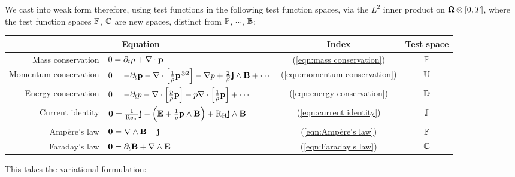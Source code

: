     We cast into weak form therefore, using test functions in the following test function spaces, via the $L^{2}$ inner product on $\pmb{\mathsf{\Omega}}\otimes[0, T]$, where the test function spaces $\mathbb{F}$, $\mathbb{C}$ are new spaces, distinct from $\mathbb{P}$, $\cdots$, $\mathbb{B}$:
    \begin{center}\begin{tabular}{ r l c | c }
        \multicolumn{2}{c}{Equation}  &  Index  &  Test space  \\
        \hline\hline
        Mass conservation  &  $0  =  \partial_{t}\rho + \nabla\cdot\mathbf{p}$  &  (\ref{eqn:mass conservation})  &  $\mathbb{P}$  \\
        Momentum conservation  &  $0  =  - \partial_{t}\mathbf{p} - \nabla\cdot\left[\frac{1}{\rho}\mathbf{p}^{\otimes 2}\right] - \nabla p + \frac{2}{\beta}\mathbf{j}\wedge\mathbf{B} + \cdots$  &  (\ref{eqn:momentum conservation})  &  $\mathbb{U}$  \\
        Energy conservation  &  $0  =  - \partial_{t}p - \nabla\cdot\left[\frac{p}{\rho}\mathbf{p}\right] - p\nabla\cdot\left[\frac{1}{\rho}\mathbf{p}\right] + \cdots$  &  (\ref{eqn:energy conservation})  &  $\mathbb{D}$  \\
        \hline
        Current identity  &  $\mathbf{0}  =  \frac{1}{\mathrm{Re}_{\mathrm{m}}}\mathbf{j} - \left(\mathbf{E} + \frac{1}{\rho}\mathbf{p}\wedge\mathbf{B}\right) + \mathrm{R}_{\mathrm{H}}\mathbf{j}\wedge\mathbf{B}$  &  (\ref{eqn:current identity})  &  $\mathbb{J}$  \\
        \hline
        Ampère's law  &  $\mathbf{0}  =  \nabla\wedge\mathbf{B} - \mathbf{j}$  &  (\ref{eqn:Ampère's law})  &  $\mathbb{F}$  \\
        Faraday's law  &  $\mathbf{0}  =  \partial_{t}\mathbf{B} + \nabla\wedge\mathbf{E}$  &  (\ref{eqn:Faraday's law})  &  $\mathbb{C}$  \\
    \end{tabular}\end{center}
    This takes the variational formulation:
